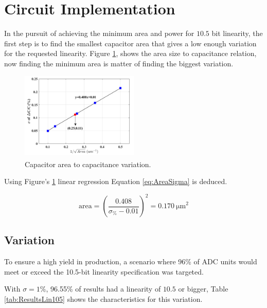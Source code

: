 \section{Circuit Implementation}
\label{sec:implementation}

In the pursuit of achieving the minimum area and power for $10.5$ bit linearity, the first step is to find the smallest capacitor area that gives a low enough variation for the requested linearity. Figure \ref{fig:Csize2sigma}, shows the area size to capacitance relation, now finding the minimum area is matter of finding the biggest variation. 

\begin{figure}[H]

    \centering
    \includegraphics*[width=0.5\textwidth]{Images/Csize2sigma.png}
    \caption{Capacitor area to capacitance variation.\textsuperscript{\cite{paper}}}

    \label{fig:Csize2sigma}
\end{figure}

Using Figure's \ref{fig:Csize2sigma} linear regression Equation \ref{eq:AreaSigma} is deduced.

\begin{equation}
    \text{area} = \left(\frac{0.408}{\sigma_\% - 0.01}\right)^2 = \SI{0.170}{\micro\meter}^2 
    \label{eq:AreaSigma}
\end{equation}

\subsection{Variation}

To ensure a high yield in production, a scenario where 96\% of ADC units would meet or exceed the 10.5-bit linearity specification was targeted. 

With $\sigma = 1\%$, 96.55\% of results had a linearity of $10.5$ or bigger, Table \ref{tab:ResultsLin105} shows the characteristics for this variation.

